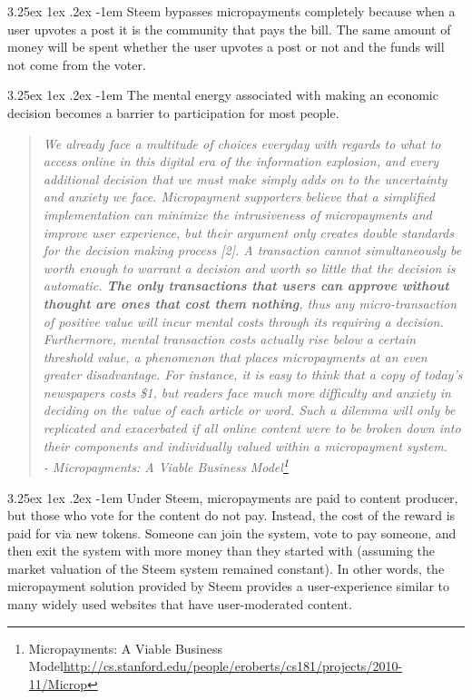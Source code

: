 \documentclass{article}
\makeatletter
\renewcommand\paragraph{\@startsection{paragraph}{5}{\z@}%
  {3.25ex \@plus1ex \@minus.2ex}%
  {-1em}%
  {\normalfont\normalsize\bfseries}}
\makeatother
\begin{document}
			\paragraph{}
				Steem bypasses micropayments completely because when a user upvotes a post it is the community that pays the bill. The same amount of money will be spent whether the user upvotes a post or not and the funds will not come from the voter.

			\paragraph{}
				The mental energy associated with making an economic decision becomes a barrier to participation for most people.

			\begin{quote}
					\textit{We already face a multitude of choices everyday with regards to what to access online in this digital era of the information explosion, and every additional decision that we must make simply adds on to the uncertainty and anxiety we face. Micropayment supporters believe that a simplified implementation can minimize the intrusiveness of micropayments and improve user experience, but their argument only creates double standards for the decision making process [2]. A transaction cannot simultaneously be worth enough to warrant a decision and worth so little that the decision is automatic. \textbf{The only transactions that users can approve without thought are ones that cost them nothing}, thus any micro-transaction of positive value will incur mental costs through its requiring a decision. Furthermore, mental transaction costs actually rise below a certain threshold value, a phenomenon that places micropayments at an even greater disadvantage. For instance, it is easy to think that a copy of today's newspapers costs \$1, but readers face much more difficulty and anxiety in deciding on the value of each article or word. Such a dilemma will only be replicated and exacerbated if all online content were to be broken down into their components and individually valued within a micropayment system.}\\

					\textit{- Micropayments: A Viable Business Model\footnote{Micropayments: A Viable Business Model\newline\url{http://cs.stanford.edu/people/eroberts/cs181/projects/2010-11/Microp}}}
			\end{quote}

			\paragraph{}
				Under Steem, micropayments are paid to content producer, but those who vote for the content do not pay. Instead, the cost of the reward is paid for via new tokens. Someone can join the system, vote to pay someone, and then exit the system with more money than they started with (assuming the market valuation of the Steem system remained constant). In other words, the micropayment solution provided by Steem provides a user-experience similar to many widely used websites that have user-moderated content.
\end{document}
